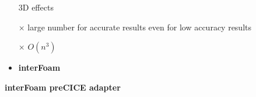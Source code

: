 \begin{frame}
\begin{minipage}{0.15\textwidth}
\end{minipage}
\begin{minipage}{0.35\textwidth}
\begin{tcolorbox} [
colframe=TUMOrange,
colback=TUMOrange!50,
title = \centering Navier-Stokes\\3D]     
\begin{itemize}
\item[\checkmark] 3D effects
\item[$\times$] large number for accurate results even for low accuracy results
\item[$\times$] $O(n^3)$\vspace{0.6cm}
\item \large \textbf{interFoam}
\end{itemize}
\end{tcolorbox}
\vspace{1cm}
\hspace{-1cm}
\vspace{0.3cm}
\begin{tcolorbox}[
colframe=TUMOrange,
colback=TUMOrange!50] 
{\large \textbf{interFoam preCICE adapter}}
\end{tcolorbox}  
\end{minipage}


%
 \end{frame}
 
 
 
